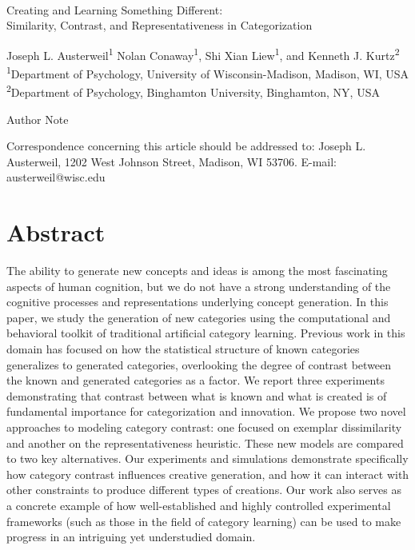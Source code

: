 \documentclass[12pt]{article}
\begin{document}
\begin{center}
\hfill
\\[1in]

Creating and Learning Something Different: \\
Similarity, Contrast, and Representativeness in Categorization


\vfill
Joseph L. Austerweil\textsuperscript{1}
Nolan Conaway\textsuperscript{1}, 
Shi Xian Liew\textsuperscript{1},
and Kenneth J. Kurtz\textsuperscript{2}
\\[\baselineskip]
\textsuperscript{1}Department of Psychology, University of Wisconsin-Madison, Madison, WI, USA
\textsuperscript{2}Department of Psychology, Binghamton University, Binghamton, NY, USA
\\[1in]

\vfill

Author Note

Correspondence concerning this article should be addressed to: 
Joseph L. Austerweil, 1202 West Johnson Street, Madison, WI 53706.
E-mail: austerweil@wisc.edu

\end{center}
\clearpage


\doublespacing
\section*{Abstract}
The ability to generate new concepts and ideas is among the most
fascinating aspects of human cognition, but we do not have a strong
understanding of the cognitive processes and representations underlying concept
generation. In this paper, we study the generation of new categories using the
computational and behavioral toolkit of traditional artificial category
learning. Previous work in this domain has focused on how the statistical
structure of known categories generalizes to generated categories, overlooking
the degree of contrast between the known and generated categories as a factor.
We report three experiments demonstrating that contrast between what is known
and what is created is of fundamental importance for categorization and innovation. We propose two novel approaches to modeling category contrast:
one focused on exemplar dissimilarity and another on the representativeness
heuristic. These new models are compared to two key alternatives. Our
experiments and simulations demonstrate specifically how category contrast
influences creative generation, and how it can interact with other constraints
to produce different types of creations. Our work also serves as a concrete
example of how well-established and highly controlled experimental frameworks
(such as those in the field of category learning) can be used to make progress
in an intriguing yet understudied domain.
\end{document}
